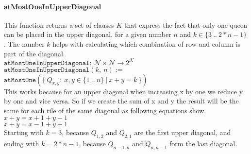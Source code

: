 \paragraph{atMostOneInUpperDiagonal}
This function returns a set of clauses $K$ that express the fact that only one queen can be placed in the upper diagonal, for a given number $n$ and $k \in \{3\ ..\ 2 * n - 1\}$. The number $k$ helps with calculating which combination of row and column is part of the diagonal.
\\[0.2cm]
\hspace*{1.3cm} $\texttt{atMostOneInUpperDiagonal}:\ \mathcal{N} \times \mathcal{N} \to 2^{\mathcal{K}}$
\\[0.2cm]
\hspace*{1.3cm} $\texttt{atMostOneInUpperDiagonal}(k,\ n) :=$
\\
\hspace*{2.6cm} $\texttt{atMostOne}(\{\ Q_{x,y} :\ x,y \in \{1\ ..\ n\}\ |\ x + y = k\ \})$
\\[0.2cm]
This works because for an upper diagonal when increasing x by one we reduce y by one and vice versa. So if we create the sum of x and y the result will be the same for each tile of the same diagonal as following equations show.
\\[0.2cm]
\hspace*{1.3cm} $x + y = x + 1 + y - 1$\\
\hspace*{1.3cm} $x + y = x - 1 + y + 1$
\\[0.2cm]
Starting with $k = 3$, because $Q_{1,2}$ and $Q_{2,1}$ are the first upper diagonal, and ending with $k = 2 * n - 1$, because $Q_{n - 1, n}$ and $Q_{n, n - 1}$ form the last diagonal.

